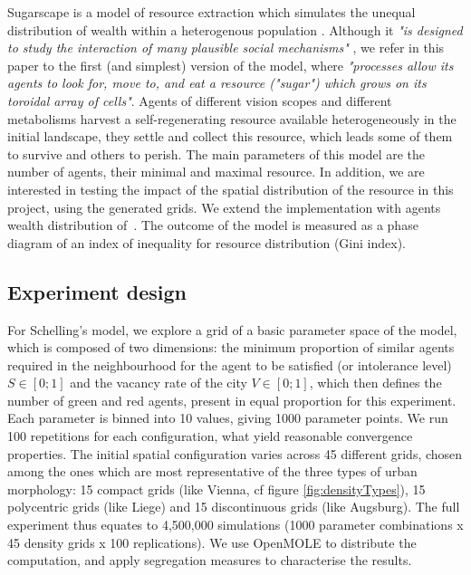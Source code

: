 \documentclass[Royal,sageh,times]{sagej}
\begin{document}
Sugarscape is a model of resource extraction which simulates the unequal distribution of wealth within a heterogenous population \citep{EpsteinAxtell1996}. Although it {\it "is designed to study the interaction of many plausible social mechanisms"} \citep[p.125]{Axtelletal1996}, we refer in this paper to the first (and simplest) version of the model, where {\it "processes allow its agents to look for, move to, and eat a resource ("sugar") which grows on its toroidal array of cells"}. Agents of different vision scopes and different metabolisms harvest a self-regenerating resource available heterogeneously in the initial landscape, they settle and collect this resource, which leads some of them to survive and others to perish. The main parameters of this model are the number of agents, their minimal and maximal resource. In addition, we are interested in testing the impact of the spatial distribution of the resource in this project, using the generated grids. We extend the implementation with agents wealth distribution of~\citet{li2009netlogo}. The outcome of the model is measured as a phase diagram of an index of inequality for resource distribution (Gini index). 


\subsection{Experiment design}
For Schelling's model, we explore a grid of a basic parameter space of the model, which is composed of two dimensions: the minimum proportion of similar agents required in the neighbourhood for the agent to be satisfied (or intolerance level) $S\in \left[0;1\right]$ and the vacancy rate of the city $V\in \left[0;1\right]$, which then defines the number of green and red agents, present in equal proportion for this experiment. Each parameter is binned into 10 values, giving 1000 parameter points. 
We run 100 repetitions for each configuration, what yield reasonable convergence properties. The initial spatial configuration varies across 45 different grids, chosen among the ones which are most representative of the three types of urban morphology: 15 compact grids (like Vienna, cf figure \ref{fig:densityTypes}), 15 polycentric grids (like Liege) and 15 discontinuous grids (like Augsburg). The full experiment thus equates to 4,500,000 simulations (1000 parameter combinations x 45 density grids x 100 replications). We use OpenMOLE to distribute the computation, and apply segregation measures to characterise the results.
\end{document}
